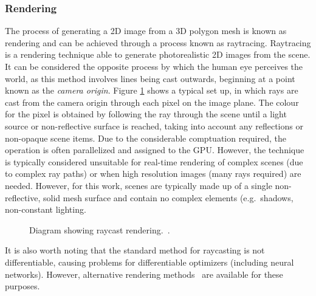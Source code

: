         \subsubsection{Rendering}
        The process of generating a 2D image from a 3D polygon mesh is known as rendering and can be achieved through a process known as raytracing. Raytracing is a rendering technique able to generate photorealistic 2D images from the scene. It can be considered the opposite process by which the human eye perceives the world, as this method involves lines being cast outwards, beginning at a point known as the \emph{camera origin}. Figure \ref{fig:raycasting} shows a typical set up, in which rays are cast from the camera origin through each pixel on the image plane. The colour for the pixel is obtained by following the ray through the scene until a light source or non-reflective surface is reached, taking into account any reflections or non-opaque scene items. Due to the considerable comptuation required, the operation is often parallelized and assigned to the GPU. However, the technique is typically considered unsuitable for real-time rendering of complex scenes (due to complex ray paths) or when high resolution images (many rays required) are needed. However, for this work, scenes are typically made up of a single non-reflective, solid mesh surface and contain no complex elements (e.g.\ shadows, non-constant lighting.

        \begin{figure}[H] %
            \caption{Diagram showing raycast rendering.~\cite{rendering}.}
            \label{fig:raycasting}
        \end{figure}

        It is also worth noting that the standard method for raycasting is not differentiable, causing problems for differentiable optimizers (including neural networks). However, alternative rendering methods~\cite{loper2014opendr} are available for these purposes.


